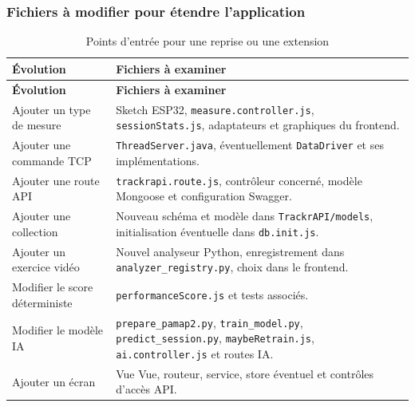 \documentclass[11pt,a4paper]{article}
\newcommand{\code}[1]{\nolinkurl{#1}}
\begin{document}
\subsubsection{Fichiers à modifier pour étendre l'application}

\begin{longtable}{L{5.2cm}L{10.8cm}}
\caption{Points d'entrée pour une reprise ou une extension}\label{tab:reprise}\\
\toprule
\textbf{Évolution} & \textbf{Fichiers à examiner} \\
\midrule
\endfirsthead
\toprule
\textbf{Évolution} & \textbf{Fichiers à examiner} \\
\midrule
\endhead
Ajouter un type de mesure & Sketch ESP32, \code{measure.controller.js}, \code{sessionStats.js}, adaptateurs et graphiques du frontend. \\
Ajouter une commande TCP & \code{ThreadServer.java}, éventuellement \code{DataDriver} et ses implémentations. \\
Ajouter une route API & \code{trackrapi.route.js}, contrôleur concerné, modèle Mongoose et configuration Swagger. \\
Ajouter une collection & Nouveau schéma et modèle dans \code{TrackrAPI/models}, initialisation éventuelle dans \code{db.init.js}. \\
Ajouter un exercice vidéo & Nouvel analyseur Python, enregistrement dans \code{analyzer_registry.py}, choix dans le frontend. \\
Modifier le score déterministe & \code{performanceScore.js} et tests associés. \\
Modifier le modèle IA & \code{prepare_pamap2.py}, \code{train_model.py}, \code{predict_session.py}, \code{maybeRetrain.js}, \code{ai.controller.js} et routes IA. \\
Ajouter un écran & Vue Vue, routeur, service, store éventuel et contrôles d'accès API. \\
\bottomrule
\end{longtable}

\clearpage
{}
{}
\listoffigures

\clearpage
{}
{}
\listofannexes

\clearpage
{}
\end{document}
